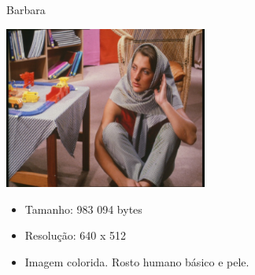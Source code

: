 \documentclass{beamer}
\begin{document}
  \begin{frame}{Barbara}
    \begin{multicols}{2}
      \includegraphics[width=0.5\textwidth]{figure/barbara100.jpg}
      \begin{itemize}
        \item Tamanho: 983 094 bytes
        \item Resolução: 640 x 512
        \item Imagem colorida. Rosto humano básico e pele.
      \end{itemize}
    \end{multicols}
  \end{frame}
\end{document}
